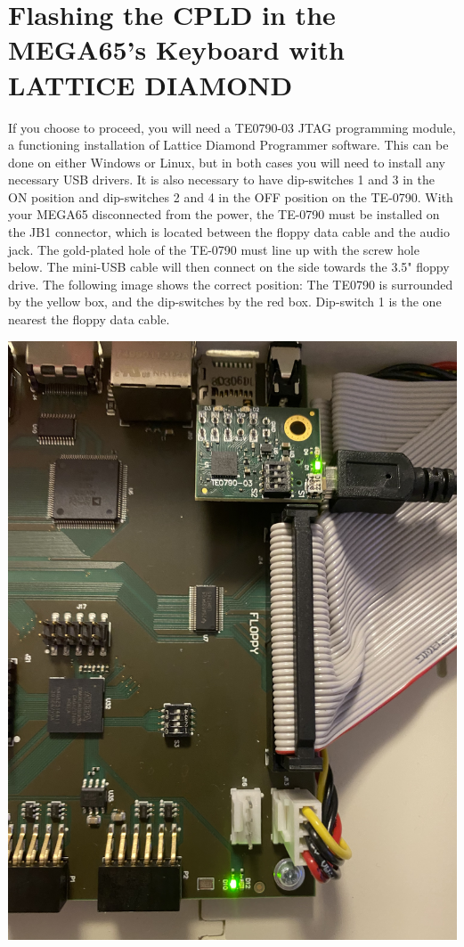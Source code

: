 \section{Flashing the CPLD in the MEGA65's Keyboard with LATTICE DIAMOND}


If you choose to proceed, you will need a TE0790-03 JTAG programming module, a functioning
installation of Lattice Diamond Programmer software.  This can be done on either Windows or Linux, but
in both cases you will need to install any necessary USB drivers. It is also necessary to have
dip-switches 1 and 3 in the ON position and dip-switches 2 and 4 in the OFF position on the TE-0790.
With your MEGA65 disconnected from the power, the TE-0790 must be installed on the JB1 connector,
which is located between the floppy data cable and the audio jack.
The gold-plated hole of the TE-0790 must line up with the screw
hole below.  The mini-USB cable will then connect on the side towards the 3.5" floppy drive.
The following image shows the correct position: The TE0790 is surrounded by the yellow box,
and the dip-switches by the red box. Dip-switch 1 is the one nearest the floppy data cable.


\includegraphics[width=\linewidth]{images/jtag_detail_05.jpg}


